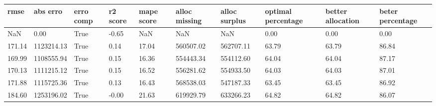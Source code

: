 \begin{tabular}{llllllllll}
\toprule
rmse & abs erro & erro comp & r2 score & mape score & alloc missing & alloc surplus & optimal percentage & better allocation & beter percentage \\
\midrule
NaN & 0.00 & True & -0.65 & NaN & NaN & NaN & 0.00 & 0.00 & 0.00 \\
171.14 & 1123214.13 & True & 0.14 & 17.04 & 560507.02 & 562707.11 & 63.79 & 63.79 & 86.84 \\
169.99 & 1108555.94 & True & 0.15 & 16.36 & 554443.34 & 554112.60 & 64.04 & 64.04 & 87.17 \\
170.13 & 1111215.12 & True & 0.15 & 16.52 & 556281.62 & 554933.50 & 64.03 & 64.03 & 87.01 \\
171.88 & 1115725.36 & True & 0.13 & 16.43 & 568538.03 & 547187.33 & 63.45 & 63.45 & 86.92 \\
184.60 & 1253196.02 & True & -0.00 & 21.63 & 619929.79 & 633266.23 & 64.82 & 64.82 & 86.07 \\
\bottomrule
\end{tabular}
